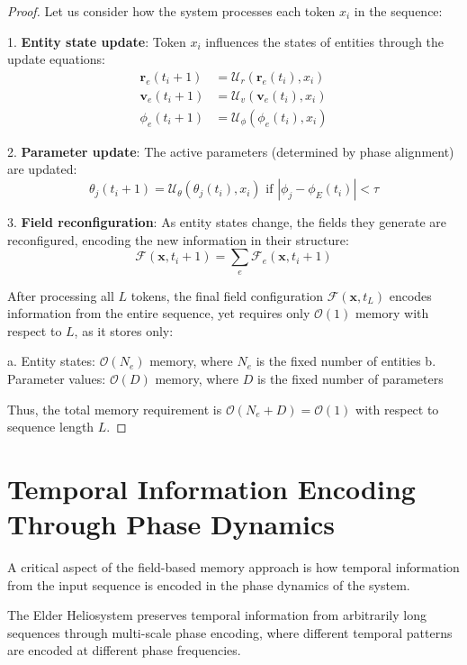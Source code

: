 \begin{proof}
Let us consider how the system processes each token $x_i$ in the sequence:

1. \textbf{Entity state update}: Token $x_i$ influences the states of entities through the update equations:
   \begin{align}
   \mathbf{r}_e(t_i+1) &= \mathcal{U}_r(\mathbf{r}_e(t_i), x_i) \\
   \mathbf{v}_e(t_i+1) &= \mathcal{U}_v(\mathbf{v}_e(t_i), x_i) \\
   \phi_e(t_i+1) &= \mathcal{U}_\phi(\phi_e(t_i), x_i)
   \end{align}

2. \textbf{Parameter update}: The active parameters (determined by phase alignment) are updated:
   \begin{equation}
   \theta_j(t_i+1) = \mathcal{U}_\theta(\theta_j(t_i), x_i) \text{ if } |\phi_j - \phi_E(t_i)| < \tau
   \end{equation}

3. \textbf{Field reconfiguration}: As entity states change, the fields they generate are reconfigured, encoding the new information in their structure:
   \begin{equation}
   \mathcal{F}(\mathbf{x}, t_i+1) = \sum_{e} \mathcal{F}_e(\mathbf{x}, t_i+1)
   \end{equation}

After processing all $L$ tokens, the final field configuration $\mathcal{F}(\mathbf{x}, t_L)$ encodes information from the entire sequence, yet requires only $\mathcal{O}(1)$ memory with respect to $L$, as it stores only:

a. Entity states: $\mathcal{O}(N_e)$ memory, where $N_e$ is the fixed number of entities
b. Parameter values: $\mathcal{O}(D)$ memory, where $D$ is the fixed number of parameters

Thus, the total memory requirement is $\mathcal{O}(N_e + D) = \mathcal{O}(1)$ with respect to sequence length $L$.
\end{proof}

\section{Temporal Information Encoding Through Phase Dynamics}

A critical aspect of the field-based memory approach is how temporal information from the input sequence is encoded in the phase dynamics of the system.

\begin{theorem}
The Elder Heliosystem preserves temporal information from arbitrarily long sequences through multi-scale phase encoding, where different temporal patterns are encoded at different phase frequencies.
\end{theorem}

